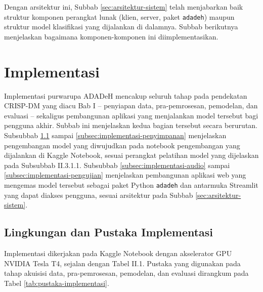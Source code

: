 Dengan arsitektur ini, Subbab \ref{sec:arsitektur-sistem} telah menjabarkan baik
struktur komponen perangkat lunak (klien, server, paket \texttt{adadeh}) maupun
struktur model klasifikasi yang dijalankan di dalamnya. Subbab berikutnya
menjelaskan bagaimana komponen-komponen ini diimplementasikan.

\section{Implementasi}
\label{sec:implementasi}

Implementasi purwarupa ADADeH mencakup seluruh tahap pada pendekatan CRISP-DM
yang diacu Bab I -- penyiapan data, pra-pemrosesan, pemodelan, dan evaluasi --
sekaligus pembangunan aplikasi yang menjalankan model tersebut bagi pengguna
akhir. Subbab ini menjelaskan kedua bagian tersebut secara berurutan. Subsubbab
\ref{subsec:lingkungan-implementasi} sampai \ref{subsec:implementasi-penyimpanan}
menjelaskan pengembangan model yang diwujudkan pada notebook pengembangan yang
dijalankan di Kaggle Notebook, sesuai perangkat pelatihan model yang dijelaskan
pada Subsubbab II.3.1.1. Subsubbab \ref{subsec:implementasi-audio} sampai
\ref{subsec:implementasi-pengujian} menjelaskan pembangunan aplikasi web yang
mengemas model tersebut sebagai paket Python \texttt{adadeh} dan antarmuka
Streamlit yang dapat diakses pengguna, sesuai arsitektur pada Subbab
\ref{sec:arsitektur-sistem}.

\subsection{Lingkungan dan Pustaka Implementasi}
\label{subsec:lingkungan-implementasi}

Implementasi dikerjakan pada Kaggle Notebook dengan akselerator GPU NVIDIA Tesla
T4, sejalan dengan Tabel II.1. Pustaka yang digunakan pada tahap akuisisi data,
pra-pemrosesan, pemodelan, dan evaluasi dirangkum pada Tabel
\ref{tab:pustaka-implementasi}.

